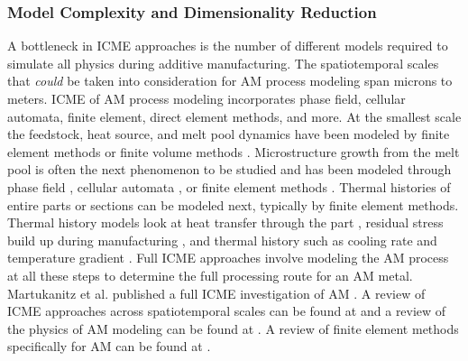 \subsubsection{Model Complexity and Dimensionality Reduction}
A bottleneck in ICME approaches is the number of different models required to simulate all physics during additive manufacturing. The spatiotemporal scales that \textit{could} be taken into consideration for AM process modeling span microns to meters. ICME of AM process modeling incorporates phase field, cellular automata, finite element, direct element methods, and more. At the smallest scale the feedstock, heat source, and melt pool dynamics have been modeled by finite element methods \cite{Toyserkani2004, Khairallah2016, Manvatkar2014} or finite  volume methods \cite{Dai2014}. Microstructure growth from the melt pool is often the next phenomenon to be studied and has been modeled through phase field \cite{Chen2002, Gong2015, Kundin2015, Sahoo2016}, cellular automata \cite{Tan2011}, or finite element methods \cite{Nie2014}. Thermal histories of entire parts or sections can be modeled next, typically by finite element methods. Thermal history models look at heat transfer through the part \cite{Michaleris2014}, residual stress build up during manufacturing \cite{Pal2014, Ding2011}, and thermal history such as cooling rate and temperature gradient \cite{Li2014, Raghavan2016}. Full ICME approaches involve modeling the AM process at all these steps to determine the full processing route for an AM metal. Martukanitz et al. published a full ICME investigation of AM \cite{Martukanitz2014}. A review of ICME approaches across spatiotemporal scales can be found at \cite{Francois2017} and a review of the physics of AM modeling can be found at \cite{King2015a}. A review of finite element methods specifically for AM can be found at \cite{Gouge2018}. 


